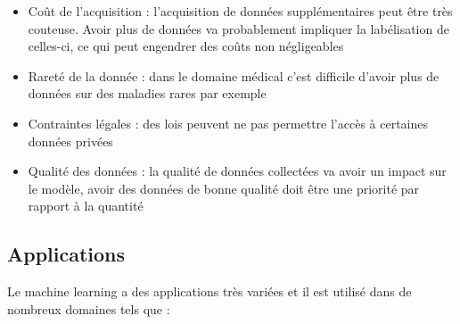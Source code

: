 \begin{itemize}
    \item Coût de l'acquisition : l'acquisition de données supplémentaires peut être très couteuse. Avoir plus de données va probablement impliquer la labélisation de celles-ci, ce qui peut engendrer des coûts non négligeables
    \item Rareté de la donnée : dans le domaine médical c'est difficile d'avoir plus de données sur des maladies rares par exemple
    \item Contraintes légales : des lois peuvent ne pas permettre l'accès à certaines données privées
    
    \item Qualité des données : la qualité de données collectées va avoir un impact sur le modèle, avoir des données de bonne qualité doit être une priorité par rapport à la quantité
\end{itemize}


\subsection{Applications}

\par{Le machine learning a des applications très variées et il est utilisé dans de nombreux domaines tels que :}

